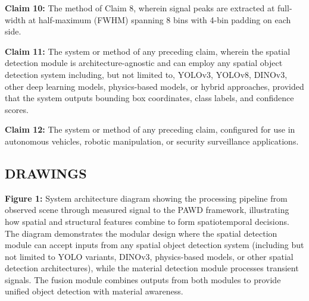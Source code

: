 \documentclass[11pt,a4paper]{article}
\begin{document}
\begin{enumerate}[leftmargin=*,label=\alph*)]
\textbf{Claim 10:} The method of Claim 8, wherein signal peaks are extracted at full-width at half-maximum (FWHM) spanning 8 bins with 4-bin padding on each side.

\textbf{Claim 11:} The system or method of any preceding claim, wherein the spatial detection module is architecture-agnostic and can employ any spatial object detection system including, but not limited to, YOLOv3, YOLOv8, DINOv3, other deep learning models, physics-based models, or hybrid approaches, provided that the system outputs bounding box coordinates, class labels, and confidence scores.

\textbf{Claim 12:} The system or method of any preceding claim, configured for use in autonomous vehicles, robotic manipulation, or security surveillance applications.

\vspace{0.5em}
\subsection{DRAWINGS}

\textbf{Figure 1:} System architecture diagram showing the processing pipeline from observed scene through measured signal to the PAWD framework, illustrating how spatial and structural features combine to form spatiotemporal decisions. The diagram demonstrates the modular design where the spatial detection module can accept inputs from any spatial object detection system (including but not limited to YOLO variants, DINOv3, physics-based models, or other spatial detection architectures), while the material detection module processes transient signals. The fusion module combines outputs from both modules to provide unified object detection with material awareness.

\begin{figure}[H]
\centering
{}
\end{figure}
\end{enumerate}
\end{document}
